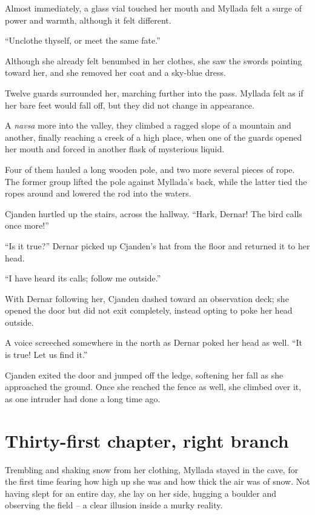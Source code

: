 Almost immediately, a glass vial touched her mouth and Myllada felt a surge of power and warmth, although it felt different.

``Unclothe thyself, or meet the same fate.''

Although she already felt benumbed in her clothes, she saw the swords pointing toward her, and she removed her coat and a sky-blue dress.

Twelve guards surrounded her, marching further into the pass. Myllada felt as if her bare feet would fall off, but they did not change in appearance.

A \emph{navsa} more into the valley, they climbed a ragged slope of a mountain and another, finally reaching a creek of a high place, when one of the guards opened her mouth and forced in another flask of mysterious liquid.

Four of them hauled a long wooden pole, and two more several pieces of rope. The former group lifted the pole against Myllada's back, while the latter tied the ropes around and lowered the rod into the waters.

\centeredstars

Cjanden hurtled up the stairs, across the hallway. ``Hark, Dernar! The bird calls once more!''

``Is it true?'' Dernar picked up Cjanden's hat from the floor and returned it to her head.

``I have heard its calls; follow me outside.''

With Dernar following her, Cjanden dashed toward an observation deck; she opened the door but did not exit completely, instead opting to poke her head outside.

A voice screeched somewhere in the north as Dernar poked her head as well. ``It is true! Let us find it.''

Cjanden exited the door and jumped off the ledge, softening her fall as she approached the ground. Once she reached the fence as well, she climbed over it, as one intruder had done a long time ago.

\section{Thirty-first chapter, right branch}

Trembling and shaking snow from her clothing, Myllada stayed in the cave, for the first time fearing how high up she was and how thick the air was of snow. Not having slept for an entire day, she lay on her side, hugging a boulder and observing the field -- a clear illusion inside a murky reality.

